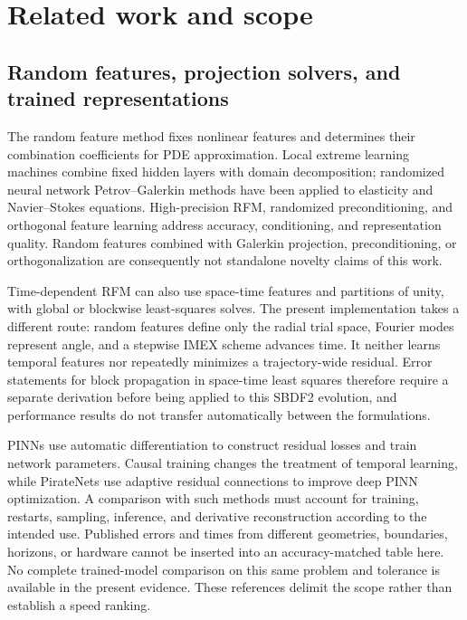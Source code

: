 \section{Related work and scope}
\label{sec:related-work}

\subsection{Random features, projection solvers, and trained representations}

The random feature method fixes nonlinear features and determines their combination coefficients for PDE approximation\cite{r1}. Local extreme learning machines combine fixed hidden layers with domain decomposition\cite{r2}; randomized neural network Petrov--Galerkin methods have been applied to elasticity and Navier--Stokes equations\cite{r3}. High-precision RFM, randomized preconditioning, and orthogonal feature learning address accuracy, conditioning, and representation quality\cite{r4,r5,r6}. Random features combined with Galerkin projection, preconditioning, or orthogonalization are consequently not standalone novelty claims of this work.

Time-dependent RFM can also use space-time features and partitions of unity, with global or blockwise least-squares solves\cite{r15}. The present implementation takes a different route: random features define only the radial trial space, Fourier modes represent angle, and a stepwise IMEX scheme advances time. It neither learns temporal features nor repeatedly minimizes a trajectory-wide residual. Error statements for block propagation in space-time least squares therefore require a separate derivation before being applied to this SBDF2 evolution, and performance results do not transfer automatically between the formulations.

PINNs use automatic differentiation to construct residual losses and train network parameters\cite{r7}. Causal training changes the treatment of temporal learning, while PirateNets use adaptive residual connections to improve deep PINN optimization\cite{r8,r16}. A comparison with such methods must account for training, restarts, sampling, inference, and derivative reconstruction according to the intended use. Published errors and times from different geometries, boundaries, horizons, or hardware cannot be inserted into an accuracy-matched table here. No complete trained-model comparison on this same problem and tolerance is available in the present evidence. These references delimit the scope rather than establish a speed ranking.

